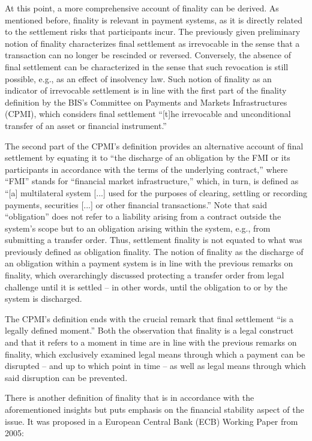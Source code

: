 At this point, a more comprehensive account of finality can be derived.
As mentioned before, finality is relevant in payment systems, as it is directly related to the settlement risks that participants incur.
The previously given preliminary notion of finality characterizes final settlement as irrevocable in the sense that a transaction can no longer be rescinded or reversed.
Conversely, the absence of final settlement can be characterized in the sense that such revocation is still possible, e.g., as an effect of insolvency law.
Such notion of finality as an indicator of irrevocable settlement is in line with the first part of the finality definition by the BIS's  Committee on Payments and Markets Infrastructures (CPMI), which considers final settlement ``[t]he irrevocable and unconditional transfer of an asset or financial instrument.'' \autocite[8]{bis2016cpmiglossary}

The second part of the CPMI's definition provides an alternative account of final settlement by equating it to ``the discharge of an obligation by the FMI or its participants in accordance with the terms of the underlying contract,'' where ``FMI'' stands for ``financial market infrastructure,'' which, in turn, is defined as ``[a] multilateral system [...] used for the purposes of clearing, settling or recording payments, securities [...] or other financial transactions.'' \autocite[8]{bis2016cpmiglossary}
Note that said ``obligation'' does not refer to a liability arising from a contract outside the system's scope but to an obligation arising within the system, e.g., from submitting a transfer order.
Thus, settlement finality is not equated to what was previously defined as obligation finality.
The notion of finality as the discharge of an obligation within a payment system is in line with the previous remarks on finality, which overarchingly discussed protecting a transfer order from legal challenge until it is settled -- in other words, until the obligation to or by the system is discharged.

The CPMI's definition ends with the crucial remark that final settlement ``is a legally defined moment.'' \autocite[8]{bis2016cpmiglossary}
Both the observation that finality is a legal construct and that it refers to a moment in time are in line with the previous remarks on finality, which exclusively examined legal means through which a payment can be disrupted -- and up to which point in time -- as well as legal means through which said disruption can be prevented.

There is another definition of finality that is in accordance with the aforementioned insights but puts emphasis on the financial stability aspect of the issue. It was proposed in a European Central Bank (ECB) Working Paper from 2005: \autocite[6]{pages2005}

